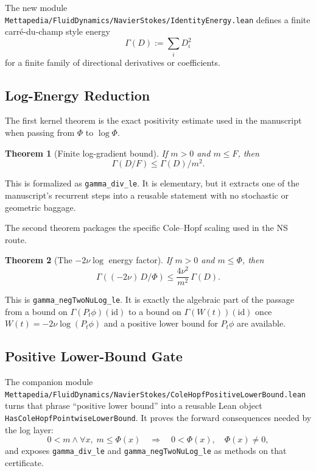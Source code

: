 \documentclass[11pt]{article}
\newtheorem{theorem}{Theorem}[section]
\theoremstyle{remark}
\begin{document}
The new module
\texttt{Mettapedia/FluidDynamics/NavierStokes/IdentityEnergy.lean}
defines a finite carré-du-champ style energy
\[
  \Gamma(D) := \sum_i D_i^2
\]
for a finite family of directional derivatives or coefficients.

\subsection{Log-Energy Reduction}

The first kernel theorem is the exact positivity estimate used in the manuscript
when passing from \(\Phi\) to \(\log \Phi\).

\begin{theorem}[Finite log-gradient bound]
If \(m > 0\) and \(m \le F\), then
\[
  \Gamma(D/F) \le \Gamma(D) / m^2.
\]
\end{theorem}

\noindent
This is formalized as \texttt{gamma\_div\_le}.  It is elementary, but it
extracts one of the manuscript's recurrent steps into a reusable statement with
no stochastic or geometric baggage.

The second theorem packages the specific Cole--Hopf scaling used in the NS
route.

\begin{theorem}[The \(-2\nu \log\) energy factor]
If \(m > 0\) and \(m \le \Phi\), then
\[
  \Gamma\!\left((-2\nu)\,D/\Phi\right)
  \le \frac{4\nu^2}{m^2}\,\Gamma(D).
\]
\end{theorem}

\noindent
This is \texttt{gamma\_negTwoNuLog\_le}.  It is exactly the algebraic part of
the passage from a bound on \(\Gamma(P_t \phi)(\mathrm{id})\) to a bound on
\(\Gamma(W(t))(\mathrm{id})\) once \(W(t) = -2\nu \log(P_t \phi)\) and a
positive lower bound for \(P_t \phi\) are available.

\subsection{Positive Lower-Bound Gate}

The companion module
\texttt{Mettapedia/FluidDynamics/NavierStokes/ColeHopfPositiveLowerBound.lean}
turns that phrase ``positive lower bound'' into a reusable Lean object
\texttt{HasColeHopfPointwiseLowerBound}.  It proves the forward consequences
needed by the log layer:
\[
  0 < m \wedge \forall x,\; m \le \Phi(x)
  \quad\Longrightarrow\quad
  0 < \Phi(x), \quad \Phi(x) \ne 0,
\]
and exposes \texttt{gamma\_div\_le} and
\texttt{gamma\_negTwoNuLog\_le} as methods on that certificate.
\end{document}
